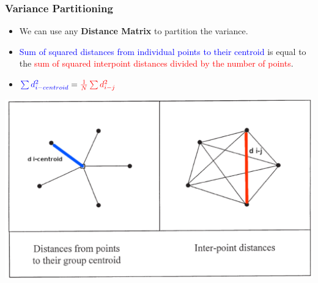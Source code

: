 \documentclass[10pt]{beamer}\usepackage[]{graphicx}\usepackage[]{color}
\begin{document}
\begin{frame}[fragile]
  \frametitle{Variance Partitioning}
  \begin{itemize}
  \item We can use any \textbf{Distance Matrix} to partition the variance.
  \pause
  \item \textcolor{blue}{Sum of squared distances from individual points to their centroid} is equal to the \textcolor{red}{sum of squared interpoint distances divided by the number of points}.
   
  \item $\textcolor{blue}{\sum d_{i-centroid}^2} = \textcolor{red}{\frac{1}{N}\sum d_{i-j}^2}$
  \end{itemize}
  \begin{centering}
  \includegraphics[height=0.5\textheight]{pics/Anderson_2001_ip.pdf}
  \end{centering}
\end{frame}
\end{document}
